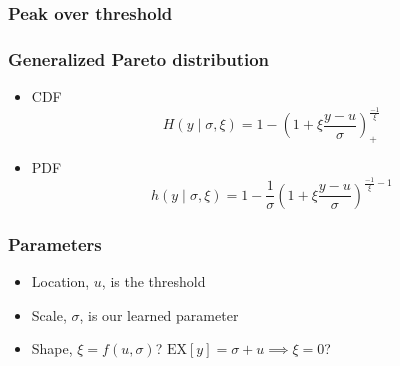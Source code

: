 \documentclass{beamer}
\begin{document}
\begin{frame}
  \frametitle{Peak over threshold}
\end{frame}

\begin{frame}
  \frametitle{Generalized Pareto distribution}
  \begin{itemize}
  \item CDF
    \begin{equation*}
      H(y\mid\sigma,\xi)
      =
      1-\left(1+\xi\frac{y-u}{\sigma}\right)_+^{\frac{-1}{\xi}}
    \end{equation*}
  \item PDF
    \begin{equation*}
      h(y\mid\sigma,\xi)
      =
      1-\frac{1}{\sigma}\left(1+\xi\frac{y-u}{\sigma}\right)^{\frac{-1}{\xi}-1}
    \end{equation*}
  \end{itemize}

\end{frame}

\begin{frame}
  \frametitle{Parameters}
  \begin{itemize}
  \item Location, \(u\), is the threshold
  \item Scale, \(\sigma\), is our learned parameter
  \item Shape, \(\xi = f(u, \sigma)\)?
    \(\text{EX}\left[y\right] = \sigma+u \implies \xi = 0\)?

  \end{itemize}

\end{frame}
\end{document}
